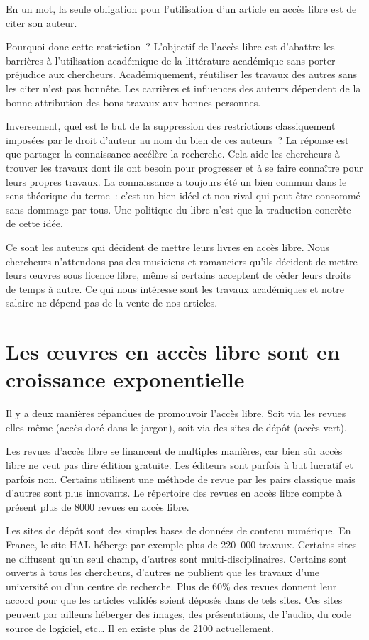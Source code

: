En un mot, la seule obligation pour l'utilisation d'un article en accès libre est de citer son auteur. 

Pourquoi donc cette restriction~? L'objectif de l'accès libre est d'abattre les barrières à l'utilisation académique de la littérature académique sans porter préjudice aux chercheurs. Académiquement, réutiliser les travaux des autres sans les citer n'est pas honnête. Les carrières et influences des auteurs dépendent de la bonne attribution des bons travaux aux bonnes personnes. 

Inversement, quel est le but de la suppression des restrictions classiquement imposées par le droit d'auteur au nom du bien de ces auteurs~? La réponse est que partager la connaissance accélère la recherche. Cela aide les chercheurs à trouver les travaux dont ils ont besoin pour progresser et à se faire connaître pour leurs propres travaux. La connaissance a toujours été un bien commun dans le sens théorique du terme~: c'est un bien idéel et non-rival qui peut être consommé sans dommage par tous. Une politique du libre n'est que la traduction concrète de cette idée. 

Ce sont les auteurs qui décident de mettre leurs livres en accès libre. Nous chercheurs n'attendons pas des musiciens et romanciers qu'ils décident de mettre leurs œuvres sous licence libre, même si certains acceptent de céder leurs droits de temps à autre. Ce qui nous intéresse sont les travaux académiques et notre salaire ne dépend pas de la vente de nos articles. 

\section{Les œuvres en accès libre sont en croissance exponentielle}

Il y a deux manières répandues de promouvoir l'accès libre. Soit via les revues elles-même (accès doré dans le jargon), soit via des sites de dépôt (accès vert). 

Les revues d'accès libre se financent de multiples manières, car bien sûr accès libre ne veut pas dire édition gratuite. Les éditeurs sont parfois à but lucratif et parfois non. Certains utilisent une méthode de revue par les pairs classique mais d'autres sont plus innovants. Le répertoire des revues en accès libre compte à présent plus de 8000 revues en accès libre.

Les sites de dépôt sont des simples bases de données de contenu numérique. En France, le site HAL héberge par exemple plus de 220~000 travaux. Certains sites ne diffusent qu'un seul champ, d'autres sont multi-disciplinaires. Certains sont ouverts à tous les chercheurs, d'autres ne publient que les travaux d'une université ou d'un centre de recherche. Plus de 60\% des revues donnent leur accord pour que les articles validés soient déposés dans de tels sites. Ces sites peuvent par ailleurs héberger des images, des présentations, de l'audio, du code source de logiciel, etc… Il en existe plus de 2100 actuellement.

